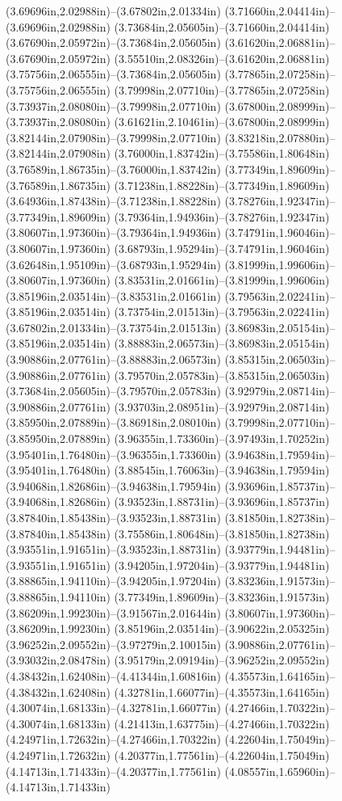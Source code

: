 (3.69696in,2.02988in)--(3.67802in,2.01334in) (3.71660in,2.04414in)--(3.69696in,2.02988in) (3.73684in,2.05605in)--(3.71660in,2.04414in) (3.67690in,2.05972in)--(3.73684in,2.05605in) (3.61620in,2.06881in)--(3.67690in,2.05972in) (3.55510in,2.08326in)--(3.61620in,2.06881in) (3.75756in,2.06555in)--(3.73684in,2.05605in) (3.77865in,2.07258in)--(3.75756in,2.06555in) (3.79998in,2.07710in)--(3.77865in,2.07258in) (3.73937in,2.08080in)--(3.79998in,2.07710in) (3.67800in,2.08999in)--(3.73937in,2.08080in) (3.61621in,2.10461in)--(3.67800in,2.08999in) (3.82144in,2.07908in)--(3.79998in,2.07710in) (3.83218in,2.07880in)--(3.82144in,2.07908in) (3.76000in,1.83742in)--(3.75586in,1.80648in) (3.76589in,1.86735in)--(3.76000in,1.83742in) (3.77349in,1.89609in)--(3.76589in,1.86735in) (3.71238in,1.88228in)--(3.77349in,1.89609in) (3.64936in,1.87438in)--(3.71238in,1.88228in) (3.78276in,1.92347in)--(3.77349in,1.89609in) (3.79364in,1.94936in)--(3.78276in,1.92347in) (3.80607in,1.97360in)--(3.79364in,1.94936in) (3.74791in,1.96046in)--(3.80607in,1.97360in) (3.68793in,1.95294in)--(3.74791in,1.96046in) (3.62648in,1.95109in)--(3.68793in,1.95294in) (3.81999in,1.99606in)--(3.80607in,1.97360in) (3.83531in,2.01661in)--(3.81999in,1.99606in) (3.85196in,2.03514in)--(3.83531in,2.01661in) (3.79563in,2.02241in)--(3.85196in,2.03514in) (3.73754in,2.01513in)--(3.79563in,2.02241in) (3.67802in,2.01334in)--(3.73754in,2.01513in) (3.86983in,2.05154in)--(3.85196in,2.03514in) (3.88883in,2.06573in)--(3.86983in,2.05154in) (3.90886in,2.07761in)--(3.88883in,2.06573in) (3.85315in,2.06503in)--(3.90886in,2.07761in) (3.79570in,2.05783in)--(3.85315in,2.06503in) (3.73684in,2.05605in)--(3.79570in,2.05783in) (3.92979in,2.08714in)--(3.90886in,2.07761in) (3.93703in,2.08951in)--(3.92979in,2.08714in) (3.85950in,2.07889in)--(3.86918in,2.08010in) (3.79998in,2.07710in)--(3.85950in,2.07889in) (3.96355in,1.73360in)--(3.97493in,1.70252in) (3.95401in,1.76480in)--(3.96355in,1.73360in) (3.94638in,1.79594in)--(3.95401in,1.76480in) (3.88545in,1.76063in)--(3.94638in,1.79594in) (3.94068in,1.82686in)--(3.94638in,1.79594in) (3.93696in,1.85737in)--(3.94068in,1.82686in) (3.93523in,1.88731in)--(3.93696in,1.85737in) (3.87840in,1.85438in)--(3.93523in,1.88731in) (3.81850in,1.82738in)--(3.87840in,1.85438in) (3.75586in,1.80648in)--(3.81850in,1.82738in) (3.93551in,1.91651in)--(3.93523in,1.88731in) (3.93779in,1.94481in)--(3.93551in,1.91651in) (3.94205in,1.97204in)--(3.93779in,1.94481in) (3.88865in,1.94110in)--(3.94205in,1.97204in) (3.83236in,1.91573in)--(3.88865in,1.94110in) (3.77349in,1.89609in)--(3.83236in,1.91573in) (3.86209in,1.99230in)--(3.91567in,2.01644in) (3.80607in,1.97360in)--(3.86209in,1.99230in) (3.85196in,2.03514in)--(3.90622in,2.05325in) (3.96252in,2.09552in)--(3.97279in,2.10015in) (3.90886in,2.07761in)--(3.93032in,2.08478in) (3.95179in,2.09194in)--(3.96252in,2.09552in) (4.38432in,1.62408in)--(4.41344in,1.60816in) (4.35573in,1.64165in)--(4.38432in,1.62408in) (4.32781in,1.66077in)--(4.35573in,1.64165in) (4.30074in,1.68133in)--(4.32781in,1.66077in) (4.27466in,1.70322in)--(4.30074in,1.68133in) (4.21413in,1.63775in)--(4.27466in,1.70322in) (4.24971in,1.72632in)--(4.27466in,1.70322in) (4.22604in,1.75049in)--(4.24971in,1.72632in) (4.20377in,1.77561in)--(4.22604in,1.75049in) (4.14713in,1.71433in)--(4.20377in,1.77561in) (4.08557in,1.65960in)--(4.14713in,1.71433in) 